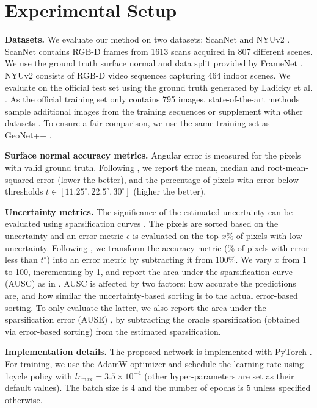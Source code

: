 \documentclass[10pt,twocolumn,letterpaper]{article}
\begin{document}
\section{Experimental Setup}

\noindent
\textbf{Datasets.} We evaluate our method on two datasets: ScanNet \cite{ScanNet} and NYUv2 \cite{NYUv2}. ScanNet contains RGB-D frames from 1613 scans acquired in 807 different scenes. We use the ground truth surface normal and data split provided by FrameNet \cite{SNfromRGB_19_FrameNet}. NYUv2 consists of RGB-D video sequences capturing 464 indoor scenes. We evaluate on the official test set using the ground truth generated by Ladicky et al. \cite{SNfromRGB_14_Ladicky}. As the official training set only contains 795 images, state-of-the-art methods sample additional images from the training sequences \cite{SNfromRGB_15_Deep3D,SNfromRGB_16_SkipNet,SNfromRGB_18_GeoNet,SNfromRGB_20_GeoNet++} or supplement with other datasets \cite{SNfromRGB_19_SR,SNfromRGB_19_FloorsAreFlat}. To ensure a fair comparison, we use the same training set as GeoNet++ \cite{SNfromRGB_20_GeoNet++}.

\noindent
\textbf{Surface normal accuracy metrics.} Angular error is measured for the pixels with valid ground truth. Following \cite{SNfromRGB_13_3DP}, we report the mean, median and root-mean-squared error (lower the better), and the percentage of pixels with error below thresholds $t \! \in \! [11.25^{\circ}, 22.5^{\circ}, 30^{\circ}]$ (higher the better).

\noindent
\textbf{Uncertainty metrics.} The significance of the estimated uncertainty can be evaluated using sparsification curves \cite{on_the_uncertainty}. The pixels are sorted based on the uncertainty and an error metric $\epsilon$ is evaluated on the top $x$\% of pixels with low uncertainty. Following \cite{on_the_uncertainty}, we transform the accuracy metric (\% of pixels with error less than $t^\circ$) into an error metric by subtracting it from 100\%. We vary $x$ from 1 to 100, incrementing by 1, and report the area under the sparsification curve (AUSC) as in \cite{ausc_defined}. AUSC is affected by two factors: how accurate the predictions are, and how similar the uncertainty-based sorting is to the actual error-based sorting. To only evaluate the latter, we also report the area under the sparsification error (AUSE) \cite{ause_defined}, by subtracting the oracle sparsification (obtained via error-based sorting) from the estimated sparsification. 

\noindent
\textbf{Implementation details.} The proposed network is implemented with PyTorch \cite{PyTorch}. For training, we use the AdamW optimizer \cite{AdamW_introduced} and schedule the learning rate using 1cycle policy \cite{1cycle-lr} with $lr_\text{max} \! = \! 3.5 \! \times \! 10^{-4}$ (other hyper-parameters are set as their default values). The batch size is 4 and the number of epochs is 5 unless specified otherwise. 
\end{document}
